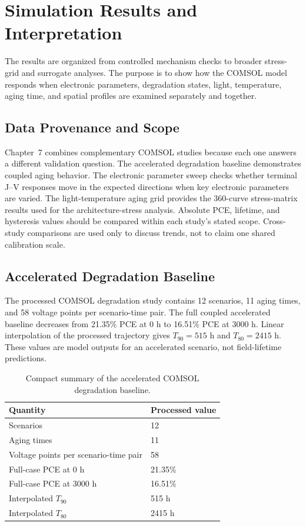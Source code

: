 \chapter{Simulation Results and Interpretation}

The results are organized from controlled mechanism checks to broader
stress-grid and surrogate analyses. The purpose is to show how the COMSOL model
responds when electronic parameters, degradation states, light, temperature,
aging time, and spatial profiles are examined separately and together.

\section{Data Provenance and Scope}

Chapter~7 combines complementary COMSOL studies because each one answers a
different validation question. The accelerated degradation baseline
demonstrates coupled aging behavior. The electronic parameter sweep checks
whether terminal J--V responses move in the expected directions when key
electronic parameters are varied. The light-temperature aging grid provides the
360-curve stress-matrix results used for the architecture-stress analysis.
Absolute PCE, lifetime, and hysteresis values should be compared within each
study's stated scope. Cross-study comparisons are used only to discuss trends,
not to claim one shared calibration scale.

\section{Accelerated Degradation Baseline}

The processed COMSOL degradation study contains 12 scenarios, 11 aging times,
and 58 voltage points per scenario-time pair. The full coupled accelerated
baseline decreases from 21.35\% PCE at 0 h to 16.51\% PCE at 3000 h. Linear
interpolation of the processed trajectory gives $T_{90}=515$ h and
$T_{80}=2415$ h. These values are model outputs for an accelerated scenario,
not field-lifetime predictions.

\begin{table}[H]
\centering
\caption{Compact summary of the accelerated COMSOL degradation baseline.}
\label{tab:baseline_summary}
\begin{tabular}{@{}ll@{}}
\toprule
Quantity & Processed value \\
\midrule
Scenarios & 12 \\
Aging times & 11 \\
Voltage points per scenario-time pair & 58 \\
Full-case PCE at 0 h & 21.35\% \\
Full-case PCE at 3000 h & 16.51\% \\
Interpolated $T_{90}$ & 515 h \\
Interpolated $T_{80}$ & 2415 h \\
\bottomrule
\end{tabular}
\end{table}


